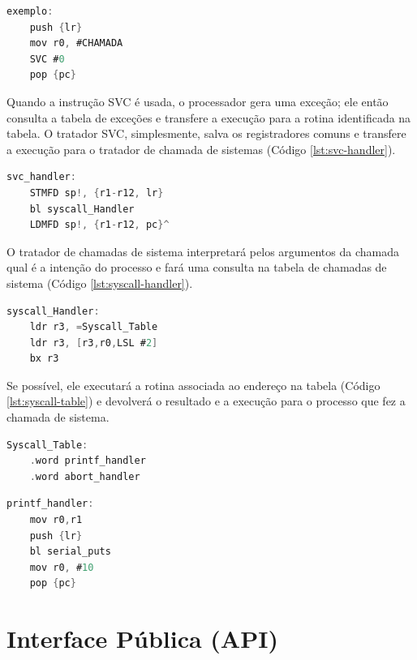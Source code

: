 \begin{lstlisting}[language=C, caption={Exemplo de invocador}, label={lst:invocador}]
exemplo:
    push {lr}
    mov r0, #CHAMADA
    SVC #0 
    pop {pc}
\end{lstlisting}

Quando a instrução SVC é usada, o processador gera uma exceção; ele então consulta a tabela de exceções e transfere a execução para a rotina identificada na tabela. O tratador SVC, simplesmente, salva os registradores comuns e transfere a execução para o tratador de chamada de sistemas (Código \ref{lst:svc-handler}).

\begin{lstlisting}[language=C, caption={Tratador SVC}, label={lst:svc-handler}]
svc_handler:
    STMFD sp!, {r1-r12, lr}
    bl syscall_Handler
    LDMFD sp!, {r1-r12, pc}^
\end{lstlisting}

O tratador de chamadas de sistema interpretará pelos argumentos da chamada qual é a intenção do processo e fará uma consulta na tabela de chamadas de sistema (Código \ref{lst:syscall-handler}).

\begin{lstlisting}[language=C, caption={Tratador de chamada de sistema}, label={lst:syscall-handler}]
syscall_Handler:
    ldr r3, =Syscall_Table
    ldr r3, [r3,r0,LSL #2]
    bx r3
\end{lstlisting}

Se possível, ele executará a rotina associada ao endereço na tabela (Código \ref{lst:syscall-table}) e devolverá o resultado e a execução para o processo que fez a chamada de sistema.

\begin{lstlisting}[language=C, caption={Tabela dos endereços das chamadas de sistema}, label={lst:syscall-table}]
Syscall_Table:
    .word printf_handler
    .word abort_handler
\end{lstlisting}

\begin{lstlisting}[language=C, caption={Exemplo de rotina que será de fato executada}, label={lst:printf-handler}]
printf_handler:
    mov r0,r1
    push {lr}
    bl serial_puts
    mov r0, #10
    pop {pc}
\end{lstlisting}


\section{Interface Pública (API)}

